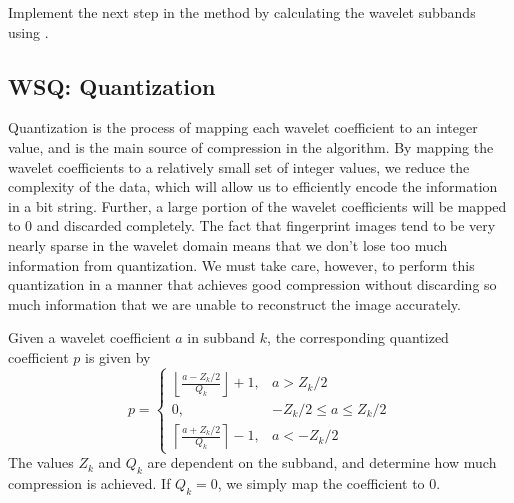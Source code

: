 \begin{problem}
Implement the next step in the  method by calculating the wavelet subbands using .
\end{problem}

\subsection*{WSQ: Quantization}
Quantization is the process of mapping each wavelet coefficient to an
integer value, and is the main source of compression in the algorithm.
By mapping
the wavelet coefficients to a relatively small set of integer values, we reduce
the complexity of the data, which will allow us to efficiently encode the information
in a bit string. Further, a large portion of the wavelet coefficients will be mapped to 0
and discarded completely.
The fact that fingerprint images tend to be very nearly sparse in the wavelet domain
means that we don't lose too much information from quantization.
We must take care, however, to perform this quantization in a
manner that achieves good compression without discarding so much information that we
are unable to reconstruct the image accurately.

Given a wavelet coefficient $a$ in subband $k$, the corresponding quantized
coefficient $p$ is given by
\[
p =
\begin{cases}
   \left\lfloor\frac{a-Z_k/2}{Q_k}\right\rfloor + 1, & a> Z_k/2 \\
   0,       & -Z_k/2 \leq a \leq Z_k/2\\
   \left\lceil\frac{a + Z_k/2}{Q_k}\right\rceil - 1, & a < -Z_k/2
  \end{cases}
\]
The values $Z_k$ and $Q_k$ are dependent on the subband, and determine how much
compression is achieved.
If $Q_k=0$, we simply map the coefficient to 0.

